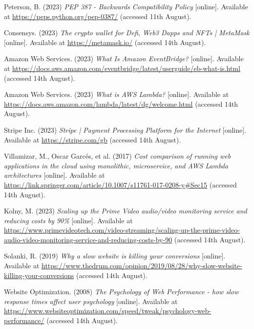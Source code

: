  \noindent [17] Peterson, B. (2023) \textit{PEP 387 - Backwards Compatibility Policy} [online]. Available at \url{https://peps.python.org/pep-0387/} (accessed 11th August).
 \vspace{0.2cm}

 \noindent [18] Consensys. (2023) \textit{The crypto wallet for Defi, Web3 Dapps and NFTs | MetaMask} [online]. Available at \url{https://metamask.io/} (accessed 14th August).
 \vspace{0.2cm}

 \noindent [19] Amazon Web Services. (2023) \textit{What Is Amazon EventBridge?} [online]. Available at \url{https://docs.aws.amazon.com/eventbridge/latest/userguide/eb-what-is.html} (accessed 14th August).
 \vspace{0.2cm}

 \noindent [20] Amazon Web Services. (2023) \textit{What is AWS Lambda?} [online]. Available at \url{https://docs.aws.amazon.com/lambda/latest/dg/welcome.html} (accessed 14th August).
 \vspace{0.2cm}

 \noindent [21] Stripe Inc. (2023) \textit{Stripe | Payment Processing Platform for the Internet} [online]. Available at \url{https://stripe.com/gb} (accessed 14th August).
 \vspace{0.2cm}

 \noindent [22] Villamizar, M., Oscar Garcés, et al. (2017) \textit{Cost comparison of running web applications in the cloud using monolithic, microservice, and AWS Lambda architectures} [online]. Available at \url{https://link.springer.com/article/10.1007/s11761-017-0208-y#Sec15} (accessed 14th August).
 \vspace{0.2cm}

 \noindent [23] Kolny, M. (2023) \textit{Scaling up the Prime Video audio/video monitoring service and reducing costs by 90\%} [online]. Available at \url{https://www.primevideotech.com/video-streaming/scaling-up-the-prime-video-audio-video-monitoring-service-and-reducing-costs-by-90} (accessed 14th August).
 \vspace{0.2cm}

 \noindent [24] Solanki, R. (2019) \textit{Why a slow website is killing your conversions} [online]. Available at \url{https://www.thedrum.com/opinion/2019/08/28/why-slow-website-killing-your-conversions} (accessed 14th August).
 \vspace{0.2cm}

 \noindent [25] Website Optimization. (2008) \textit{The Psychology of Web Performance - how slow response times affect user psychology} [online]. Available at \url{https://www.websiteoptimization.com/speed/tweak/psychology-web-performance/} (accessed 14th August).
 \vspace{0.2cm}

